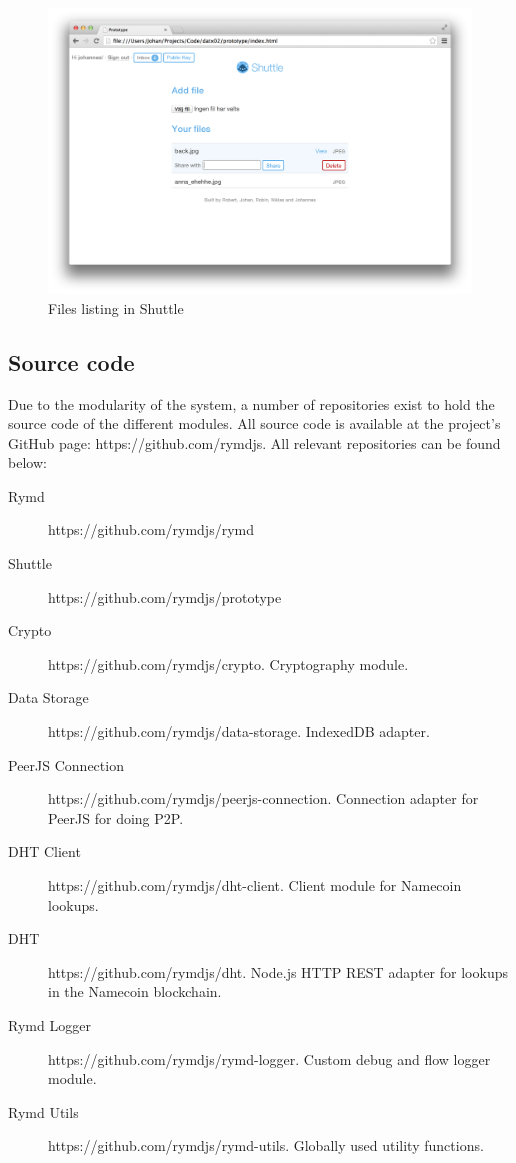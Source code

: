 \begin{figure}[h]
\centering
\includegraphics[width=\textwidth,height=0.2\paperheight,keepaspectratio
]{figures/shuttle-files}
\caption{Files listing in Shuttle}
\label{fig:shuttle-files}
\end{figure}

\subsection{Source code}

Due to the modularity of the system, a number of repositories exist to hold the source code of the different modules. All source code is available at the project's GitHub page: https://github.com/rymdjs. All relevant repositories can be found below:

\begin{description}
  \item[Rymd] https://github.com/rymdjs/rymd
  \item[Shuttle] https://github.com/rymdjs/prototype
  \item[Crypto] https://github.com/rymdjs/crypto. Cryptography module.
  \item[Data Storage] https://github.com/rymdjs/data-storage. IndexedDB adapter.
  \item[PeerJS Connection] https://github.com/rymdjs/peerjs-connection. Connection adapter for PeerJS for doing P2P.
  \item[DHT Client] https://github.com/rymdjs/dht-client. Client module for Namecoin lookups.
  \item[DHT] https://github.com/rymdjs/dht. Node.js HTTP REST adapter for lookups in the Namecoin blockchain.
  \item[Rymd Logger] https://github.com/rymdjs/rymd-logger. Custom debug and flow logger module.
  \item[Rymd Utils] https://github.com/rymdjs/rymd-utils. Globally used utility functions.
\end{description}

